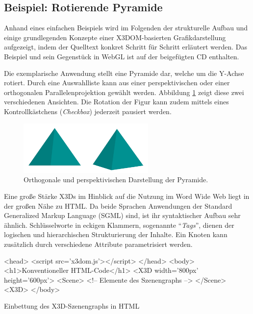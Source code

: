 \subsection{Beispiel: Rotierende Pyramide}
\label{SEC:X3D_EXAMPLE}

Anhand eines einfachen Beispiels wird im Folgenden der strukturelle Aufbau und einige grundlegenden Konzepte einer X3DOM-basierten Grafikdarstellung aufgezeigt, indem der Quelltext konkret Schritt für Schritt erläutert werden. Das Beispiel und sein Gegenstück in WebGL ist auf der beigefügten CD enthalten.

Die exemplarische Anwendung stellt eine Pyramide dar, welche um die Y-Achse rotiert. Durch eine Auswahlliste kann aus einer perspektivischen oder einer orthogonalen Parallelenprojektion gewählt werden. Abbildung \ref{FIG:X3DOM_EXAMPLE_PROJECTIONS} zeigt diese zwei verschiedenen Ansichten. Die Rotation der Figur kann zudem mittels eines Kontrollkästchens (\emph{Checkbox}) jederzeit pausiert werden.

\begin{figure}[htb]
	\centering
	\includegraphics[width=0.6\textwidth]{kap4/x3d/figures/example_orthogonal_vs_perspective.png}
	\caption{Orthogonale und perspektivischen Darstellung der Pyramide.}
	\label{FIG:X3DOM_EXAMPLE_PROJECTIONS}
\end{figure}

Eine große Stärke X3Ds im Hinblick auf die Nutzung im Word Wide Web liegt in der großen Nähe zu HTML. Da beide Sprachen Anwendungen der Standard Generalized Markup Language (SGML) sind, ist ihr syntaktischer Aufbau sehr ähnlich. Schlüsselworte in eckigen Klammern, sogenannte \enquote{\emph{Tags}}, dienen der logischen und hierarchischen Strukturierung der Inhalte. Ein Knoten kann zusätzlich durch verschiedene Attribute parametrisiert werden.

\smallskip
\begin{listing}[!h]
\begin{htmlcode}
<head>
	<script src='x3dom.js'></script>
</head>
<body>
	<h1>Konventioneller HTML-Code</h1>
	<X3D width='800px' height='600px'>
		<Scene>
			<!-- Elemente des Szenengraphs -->
		</Scene>
	<X3D>
</body>
\end{htmlcode}
\caption{Einbettung des X3D-Szenengraphs in HTML}
\label{LISTING:X3D_EXAMPLE_EMBEDDING_SCENEGRAPH}
\end{listing}

